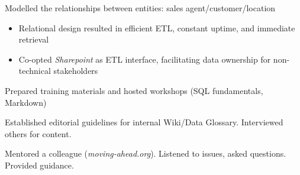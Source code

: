 \documentclass[../cv.tex]{subfiles}
\begin{document}
\begin{description}[style=multiline, leftmargin=3.5cm]
\begin{itemize}
	      \end{itemize}
	\item[Sales Relational Model\\ \textnormal{Oracle}]
	      Modelled the relationships between entities: sales agent/customer/location
	      \begin{itemize}		      
		      \item Relational design resulted in efficient ETL, constant uptime, and immediate retrieval
		      \item Co-opted \textit{Sharepoint} as ETL interface, facilitating data ownership for non-technical stakeholders
	      \end{itemize}
	\item[Training] Prepared training materials and hosted workshops (SQL fundamentals, Markdown)
	\item[Data Glossary] Established editorial guidelines for internal Wiki/Data Glossary. Interviewed others for content.
	\item[Mentorship] Mentored a colleague (\textit{moving-ahead.org}). Listened to issues, asked questions. Provided guidance.
\end{description}
\end{document}
